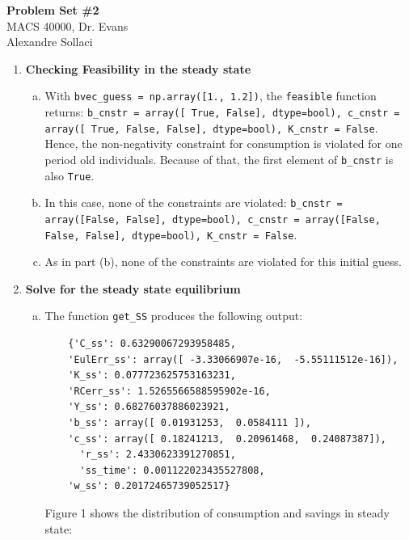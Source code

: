 \documentclass[letterpaper,12pt]{article}
\theoremstyle{definition}
\begin{document}
\begin{flushleft}
   \textbf{\large{Problem Set \#2}} \\
   MACS 40000, Dr. Evans \\
   Alexandre Sollaci
\end{flushleft}

\vspace{5mm}

\noindent\begin{enumerate}
   \item \textbf{Checking Feasibility in the steady state}
	\begin{enumerate}[(a)]
		\item With \texttt{bvec\_guess = np.array([1., 1.2])}, the \texttt{feasible} function returns:
		 \texttt{b\_cnstr = array([ True, False], dtype=bool), c\_cnstr = array([ True, False, False], dtype=bool), K\_cnstr = False}. \linebreak
		 Hence, the non-negativity constraint for consumption is violated for one period old individuals. Because of that, the first element of \texttt{b\_cnstr} is also \texttt{True}.
		 
		 \item In this case, none of the constraints are violated: \hfill \hfill \linebreak
		 \texttt{b\_cnstr = array([False, False], dtype=bool), c\_cnstr = array([False, False, False], dtype=bool), K\_cnstr = False}.
		 
		\item As in part (b), none of the constraints are violated for this initial guess. 
		 
	\end{enumerate}
		
		
   \item \textbf{Solve for the steady state equilibrium}
   \begin{enumerate}[(a)]
   \item The function \texttt{get\_SS} produces the following output:
   
   \begin{verbatim}
   	{'C_ss': 0.63290067293958485,
 	'EulErr_ss': array([ -3.33066907e-16,  -5.55111512e-16]),
 	'K_ss': 0.077723625753163231,
 	'RCerr_ss': 1.5265566588595902e-16,
 	'Y_ss': 0.68276037886023921,
 	'b_ss': array([ 0.01931253,  0.0584111 ]),
 	'c_ss': array([ 0.18241213,  0.20961468,  0.24087387]),
	  'r_ss': 2.4330623391270851,
	  'ss_time': 0.001122023435527808,
 	'w_ss': 0.20172465739052517}
	\end{verbatim}    
Figure 1 shows the distribution of consumption and savings in steady state:
	

\end{enumerate}
\end{enumerate}
\end{document}
